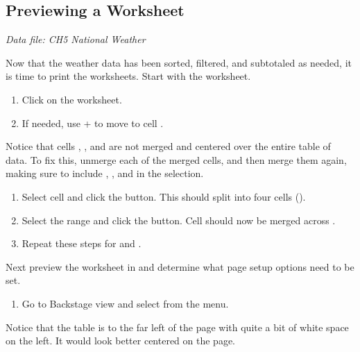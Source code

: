 \subsection{Previewing a Worksheet}

\textit{Data file: CH5 National Weather}

Now that the weather data has been sorted, filtered, and subtotaled as needed, it is time to print the worksheets. Start with the  worksheet.

\begin{enumerate}
	\item Click on the  worksheet. 
	\item If needed, use + to move to cell .
\end{enumerate}

Notice that cells , , and  are not merged and centered over the entire table of data. To fix this, unmerge each of the merged cells, and then merge them again, making sure to include , , and  in the selection.

\begin{enumerate}
	\item Select cell  and click the  button. This should split  into four cells ().
	\item Select the range  and click the  button. Cell  should now be merged across .
	\item Repeat these steps for  and .
\end{enumerate}

Next preview the worksheet in  and determine what page setup options need to be set.

\begin{enumerate}
	\item Go to Backstage view and select  from the menu.
\end{enumerate}

Notice that the table is to the far left of the page with quite a bit of white space on the left. It would look better centered on the page.

